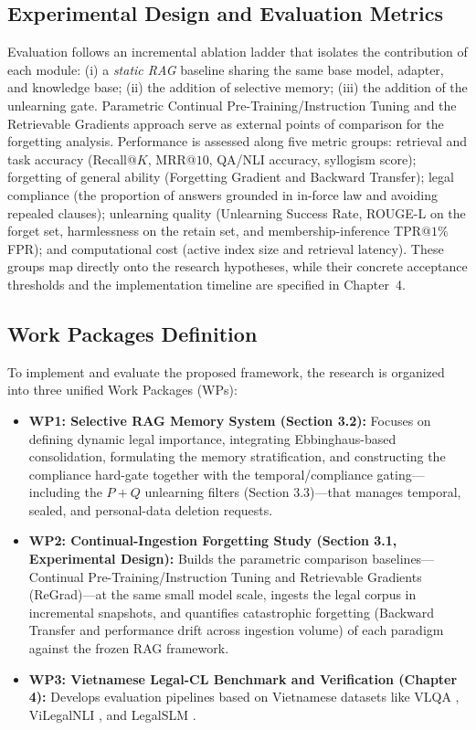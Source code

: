 \subsection{Experimental Design and Evaluation Metrics}
Evaluation follows an incremental ablation ladder that isolates the contribution of each module: (i) a \emph{static RAG} baseline sharing the same base model, adapter, and knowledge base; (ii) the addition of selective memory; (iii) the addition of the unlearning gate. Parametric Continual Pre-Training/Instruction Tuning and the Retrievable Gradients approach serve as external points of comparison for the forgetting analysis. Performance is assessed along five metric groups: retrieval and task accuracy (Recall@$K$, MRR@$10$, QA/NLI accuracy, syllogism score); forgetting of general ability (Forgetting Gradient and Backward Transfer); legal compliance (the proportion of answers grounded in in-force law and avoiding repealed clauses); unlearning quality (Unlearning Success Rate, ROUGE-L on the forget set, harmlessness on the retain set, and membership-inference TPR@$1\%$FPR); and computational cost (active index size and retrieval latency). These groups map directly onto the research hypotheses, while their concrete acceptance thresholds and the implementation timeline are specified in Chapter~4.

\subsection{Work Packages Definition}
To implement and evaluate the proposed framework, the research is organized into three unified Work Packages (WPs):
\begin{itemize}
    \item \textbf{WP1: Selective RAG Memory System (Section 3.2):} Focuses on defining dynamic legal importance, integrating Ebbinghaus-based consolidation, formulating the memory stratification, and constructing the compliance hard-gate together with the temporal/compliance gating---including the $P{+}Q$ unlearning filters (Section 3.3)---that manages temporal, sealed, and personal-data deletion requests.
    \item \textbf{WP2: Continual-Ingestion Forgetting Study (Section 3.1, Experimental Design):} Builds the parametric comparison baselines---Continual Pre-Training/Instruction Tuning and Retrievable Gradients (ReGrad)---at the same small model scale, ingests the legal corpus in incremental snapshots, and quantifies catastrophic forgetting (Backward Transfer and performance drift across ingestion volume) of each paradigm against the frozen RAG framework.
    \item \textbf{WP3: Vietnamese Legal-CL Benchmark and Verification (Chapter 4):} Develops evaluation pipelines based on Vietnamese datasets like VLQA \parencite{nguyen2025vlqacomprehensivelargehighquality}, ViLegalNLI \parencite{duong2026vilegalnlinaturallanguageinference}, and LegalSLM \parencite{le-etal-2025-overview}.
\end{itemize}

